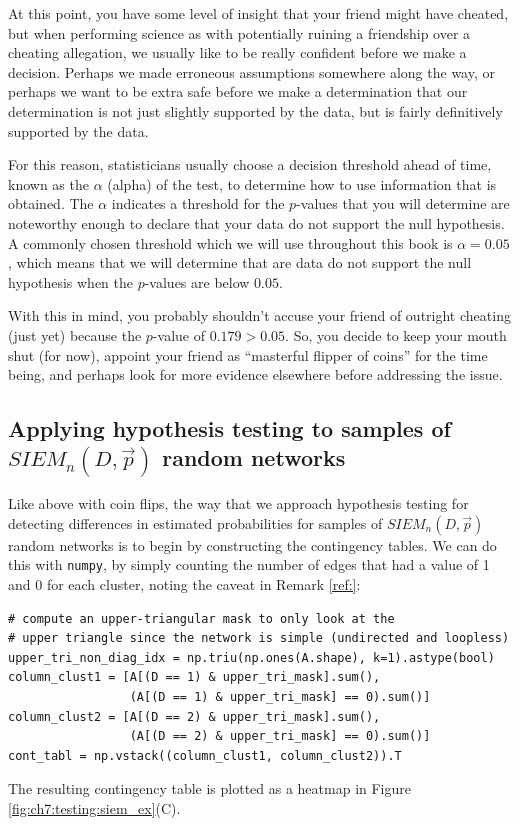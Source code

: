 At this point, you have some level of insight that your friend might have cheated, but when performing science as with potentially ruining a friendship over a cheating allegation, we usually like to be really confident before we make a decision. Perhaps we made erroneous assumptions somewhere along the way, or perhaps we want to be extra safe before we make a determination that our determination is not just slightly supported by the data, but is fairly definitively supported by the data. 

For this reason, statisticians usually choose a decision threshold ahead of time, known as the $\alpha$ (alpha) of the test, to determine how to use information that is obtained. The $\alpha$ indicates a threshold for the $p$-values that you will determine are noteworthy enough to declare that your data do not support the null hypothesis. A commonly chosen threshold which we will use throughout this book is $\alpha = 0.05$, which means that we will determine that are data do not support the null hypothesis when the $p$-values are below $0.05$. 

With this in mind, you probably shouldn't accuse your friend of outright cheating (just yet) because the $p$-value of $0.179 > 0.05$. So, you decide to keep your mouth shut (for now), appoint your friend as ``masterful flipper of coins'' for the time being, and perhaps look for more evidence elsewhere before addressing the issue. 

\subsection{Applying hypothesis testing to samples of $SIEM_n(D, \vec p)$ random networks}

Like above with coin flips, the way that we approach hypothesis testing for detecting differences in estimated probabilities for samples of $SIEM_n(D, \vec p)$ random networks is to begin by constructing the contingency tables. We can do this with \texttt{numpy}, by simply counting the number of edges that had a value of 1 and 0 for each cluster, noting the caveat in Remark \ref{ref:}:

\begin{lstlisting}[style=python]
# compute an upper-triangular mask to only look at the
# upper triangle since the network is simple (undirected and loopless)
upper_tri_non_diag_idx = np.triu(np.ones(A.shape), k=1).astype(bool)
column_clust1 = [A[(D == 1) & upper_tri_mask].sum(), 
                 (A[(D == 1) & upper_tri_mask] == 0).sum()]
column_clust2 = [A[(D == 2) & upper_tri_mask].sum(), 
                 (A[(D == 2) & upper_tri_mask] == 0).sum()]
cont_tabl = np.vstack((column_clust1, column_clust2)).T
\end{lstlisting}
The resulting contingency table is plotted as a heatmap in Figure \ref{fig:ch7:testing:siem_ex}(C). 

